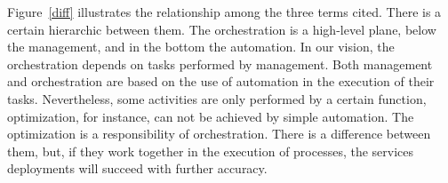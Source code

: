Figure~\ref{diff} illustrates  the relationship among the three terms cited. There is a certain hierarchic between them. The orchestration is a high-level plane, below the management, and in the bottom the automation. In our vision, the orchestration depends on tasks performed by management. Both management and orchestration are based on the use of automation in the execution of their tasks. Nevertheless, some activities are only performed by a certain function, optimization, for instance, can not be achieved by simple automation. The optimization is a responsibility of orchestration. There is a difference between them, but, if they work together in the execution of processes, the services deployments will succeed with further accuracy.